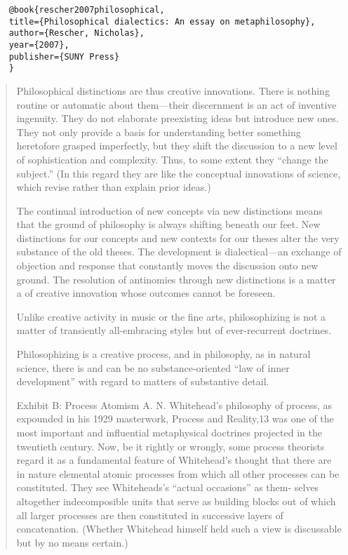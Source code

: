 \documentclass[a4paper]{Thesis}
\begin{document}
	\begin{verbatim}
	@book{rescher2007philosophical,
	title={Philosophical dialectics: An essay on metaphilosophy},
	author={Rescher, Nicholas},
	year={2007},
	publisher={SUNY Press}
	}
	\end{verbatim}
	
	\begin{quotation}
		Philosophical distinctions are thus creative innovations. There is
		nothing routine or automatic about them—their discernment is an act of
		inventive ingenuity. They do not elaborate preexisting ideas but introduce
		new ones. They not only provide a basis for understanding better something
		heretofore grasped imperfectly, but they shift the discussion to a
		new level of sophistication and complexity. Thus, to some extent they
		“change the subject.” (In this regard they are like the conceptual innovations
		of science, which revise rather than explain prior ideas.)
		
		The continual introduction of new concepts via new distinctions
		means that the ground of philosophy is always shifting beneath our feet.
		New distinctions for our concepts and new contexts for our theses alter the
		very substance of the old theses. The development is dialectical—an exchange
		of objection and response that constantly moves the discussion
		onto new ground. The resolution of antinomies through new distinctions
		is a matter a of creative innovation whose outcomes cannot be foreseen.
		
		Unlike creative activity in music
		or the fine arts, philosophizing is not a matter of transiently all-embracing
		styles but of ever-recurrent doctrines.
		
		Philosophizing is a creative
		process, and in philosophy, as in natural science, there is and can
		be no substance-oriented “law of inner development” with regard to
		matters of substantive detail.
		
		Exhibit B: Process Atomism
		A. N. Whitehead’s philosophy of process, as expounded in his
		1929 masterwork, Process and Reality,13 was one of the most important
		and influential metaphysical doctrines projected in the twentieth
		century. Now, be it rightly or wrongly, some process theorists regard
		it as a fundamental feature of Whitehead’s thought that there are in
		nature elemental atomic processes from which all other processes can
		be constituted. They see Whiteheads’s “actual occasions” as them-
		selves altogether indecomposible units that serve as building blocks
		out of which all larger processes are then constituted in successive
		layers of concatenation. (Whether Whitehead himself held such
		a view is discussable but by no means certain.)
		
	\end{quotation}
	
\end{document}
